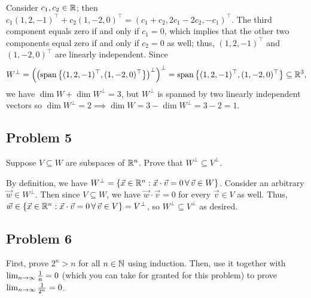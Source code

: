 \documentclass[main.tex]{subfiles}
\begin{document}
\begin{soln}
    Consider $c_1, c_2\in \mathbb R$; then $c_1(1, 2, -1)^\top + c_2(1, -2, 0)^\top = (c_1 + c_2, 2c_1 - 2c_2, -c_1)^\top$. The third component equals zero if and only if $c_1 = 0$, which implies that the other two components equal zero if and only if $c_2 = 0$ as well; thus, $(1, 2, -1)^\top$ and $(1, -2, 0)^\top$ are linearly independent. Since
    \[W^\perp = \left(\left(\operatorname{span}\left\{(1, 2, -1)^\top, (1, -2, 0)^\top\right\}\right)^\perp\right)^\perp = \operatorname{span}\left\{(1, 2, -1)^\top, (1, -2, 0)^\top\right\}\subseteq \mathbb R^3,\]
    we have $\dim W + \dim W^\perp = 3$, but $W^\perp$ is spanned by two linearly independent vectors so $\dim W^\perp = 2 \implies \dim W = 3 - \dim W^\perp = 3 - 2 = 1$.
\end{soln}
\eject

\subsection{Problem 5}
\begin{claim}
    Suppose $V \subseteq W$ are subspaces of $\mathbb R^n$. Prove that $W^\perp \subseteq V^\perp$.
\end{claim}

\begin{soln}
    By definition, we have $W^\perp = \{\vec{x}\in \mathbb R^n : \vec{x}\cdot \vec{v} = 0\,\forall\, \vec{v}\in W\}$. Consider an arbitrary $\vec{w}\in W^\perp$. Then since $V\subseteq W$, we have $\vec{w}\cdot \vec{v} = 0$ for every $\vec{v}\in V$ as well. Thus, $\vec{w} \in \{\vec{x}\in \mathbb R^n : \vec{x}\cdot \vec{v} = 0\,\forall\, \vec{v}\in V\} = V^\perp$, so $W^\perp\subseteq V^\perp$ as desired.
\end{soln}
\eject

\subsection{Problem 6}
\begin{claim}
    First, prove $2^n > n$ for all $n \in \mathbb N$ using induction. Then, use it together with $\lim_{n\to \infty} \frac{1}{n} = 0$ (which you can take for granted for this problem) to prove $\lim_{n\to \infty} \frac{1}{2^n} = 0$.
\end{claim}
\end{document}
